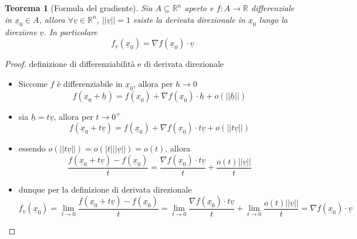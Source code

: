 \documentclass[12pt, a4paper]{article}
\theoremstyle{break}
\newtheorem{theorem}{Teorema} %
\begin{document}
\newpage
\begin{theorem} [Formula del gradiente]
	Sia $A \subseteq \mathbb{R}^n$ aperto e $f: A \to \mathbb{R}$
	differenziale in $\underline{x}_0 \in A$, allora $\forall \underline{v} \in
		\mathbb{R}^n$, $||\underline{v}|| = 1$ esiste la derivata direzionale in
	$\underline{x}_0$ lungo la direzione $\underline{v}$. In particolare
	\[
		f_{\underline{v}}(\underline{x}_0) = \nabla f(\underline{x}_0) \cdot
		\underline{v}
	\]
\end{theorem}
\begin{proof} definizione di differenziabilità e di derivata direzionale
	\begin{itemize}
		\item Siccome $f$ è differenziabile in $\underline{x}_0$, allora per $h
				\to 0$
			\[
				f(\underline{x}_0 + \underline{h}) = f(\underline{x}_0) + \nabla f
				(\underline{x}_0) \cdot \underline{h}
				+ o(||\underline{h}||)
			\]
		\item sia $\underline{h} = t \underline{v}$, allora per $t \to 0^+$
			\[
				f(\underline{x}_0 + t \underline{v}) = f(\underline{x}_0) +
				\nabla f (\underline{x}_0) \cdot t \underline{v}
				+ o(||t \underline{v}||)
			\]
		\item essendo $o(||t \underline{v}||) = o(|t| || \underline{v}||) =
				o(t)$, allora
			\[
				\frac{f(\underline{x}_0 + t \underline{v}) -
				f(\underline{x}_0)}{t} = \frac{\nabla f (\underline{x}_0) \cdot
				t \underline{v}}{t} + \frac{o(t)||\underline{v}||}{t}
			\]
		\item dunque per la definizione di derivata direzionale
			\[
				f_{\underline{v}}(\underline{x}_0)
				= \lim_{t \to 0} \frac{f(\underline{x}_0 + t \underline{v}) -
				f(\underline{x}_0)}{t}
				= \lim_{t \to 0} \frac{\nabla f (\underline{x}_0) \cdot t
				\underline{v}}{t} + \lim_{t \to 0}\frac{o(t) ||\underline{v}||}
				{t} = \nabla f(\underline{x}_0) \cdot \underline{v}
			\]
	\end{itemize}
\end{proof}
\end{document}
